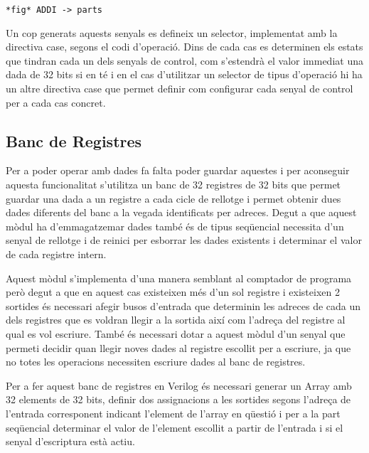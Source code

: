 \documentclass[10pt,a4paper,twocolumn,twoside]{article}
\begin{document}
    \verb|*fig* ADDI -> parts|
    
    Un cop generats aquests senyals es defineix un selector, implementat amb la directiva case, segons el codi d'operació. Dins de cada cas es determinen els estats que tindran cada un dels senyals de control, com s'estendrà el valor immediat una dada de 32 bits si en té i en el cas d'utilitzar un selector de tipus d'operació hi ha un altre directiva case que permet definir com configurar cada senyal de control per a cada cas concret.
    
    
    
    
    
    \subsection{Banc de Registres}
    Per a poder operar amb dades fa falta poder guardar aquestes i per aconseguir aquesta funcionalitat s'utilitza un banc de 32 registres de 32 bits que permet guardar una dada a un registre a cada cicle de rellotge i permet obtenir dues dades diferents del banc a la vegada identificats per adreces.
    Degut a que aquest mòdul ha d'emmagatzemar dades també és de tipus seqüencial necessita d'un senyal de rellotge i de reinici per esborrar les dades existents i determinar el valor de cada registre intern.
    
    Aquest mòdul s'implementa d'una manera semblant al comptador de programa però degut a que en aquest cas existeixen més d'un sol registre i existeixen 2 sortides és necessari afegir busos d'entrada que determinin les adreces de cada un dels registres que es voldran llegir a la sortida així com l'adreça del registre al qual es vol escriure. També és necessari dotar a aquest mòdul d'un senyal que permeti decidir quan llegir noves dades al registre escollit per a escriure, ja que no totes les operacions necessiten escriure dades al banc de registres. 
    
    Per a fer aquest banc de registres en Verilog és necessari generar un Array amb 32 elements de 32 bits, definir dos assignacions a les sortides segons l'adreça de l'entrada corresponent indicant l'element de l'array en qüestió i per a la part seqüencial determinar el valor de l'element escollit a partir de l'entrada i si el senyal d'escriptura està actiu.
    
\end{document}
